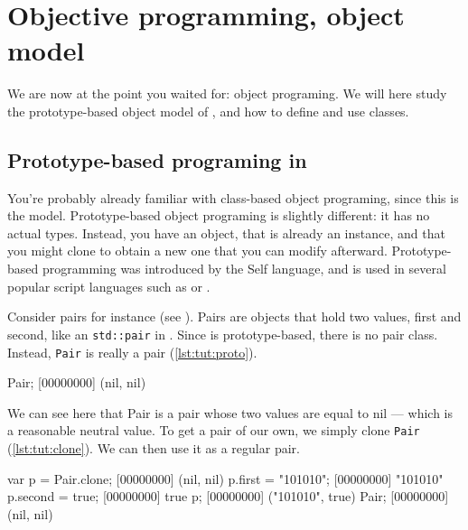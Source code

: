 
\chapter{Objective programming, \us object model}
\label{section:objective}


We are now at the point you waited for: object programing. We will
here study the prototype-based object model of \us, and how to
define and use classes.

\section{Prototype-based programing in \us}

You're probably already familiar with class-based object programing,
since this is the \Cxx model. Prototype-based object programing is
slightly different: it has no actual types. Instead, you have an
object, that is already an instance, and that you might clone to
obtain a new one that you can modify afterward. Prototype-based
programming was introduced by the Self language, and is used in
several popular script languages such as \io or \js.

Consider pairs for instance (see ). Pairs are objects
that hold two values,
first and second, like an \lstinline{std::pair} in \Cxx. Since \us is
prototype-based, there is no pair class. Instead, \lstinline|Pair| is
really a pair (\autoref{lst:tut:proto}).

\begin{urbiscript}[caption=Prototypes in \us, label=lst:tut:proto]
Pair;
[00000000] (nil, nil)
\end{urbiscript}

We can see here that Pair is a pair whose two values are equal to nil
--- which is a reasonable neutral value. To get a pair of our own, we
simply clone \lstinline|Pair| (\autoref{lst:tut:clone}). We can then use it as a
regular pair.

\begin{urbiscript}[caption=Cloning, label=lst:tut:clone]
var p = Pair.clone;
[00000000] (nil, nil)
p.first = "101010";
[00000000] "101010"
p.second = true;
[00000000] true
p;
[00000000] ("101010", true)
Pair;
[00000000] (nil, nil)
\end{urbiscript}

